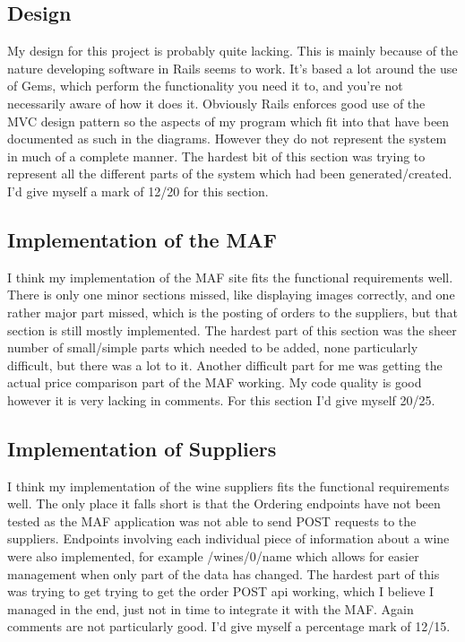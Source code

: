 \documentclass[11pt]{article}
\begin{document}
\subsection{Design}
My design for this project is probably quite lacking. This is mainly because of the nature developing software in Rails seems to work. It's based a lot around the use of Gems, which perform the functionality you need it to, and you're not necessarily aware of how it does it. Obviously Rails enforces good use of the MVC design pattern so the aspects of my program which fit into that have been documented as such in the diagrams. However they do not represent the system in much of a complete manner.
The hardest bit of this section was trying to represent all the different parts of the system which had been generated/created. I'd give myself a mark of 12/20 for this section.

\subsection{Implementation of the MAF}
I think my implementation of the MAF site fits the functional requirements well. There is only one minor sections missed, like displaying images correctly, and one rather major part missed, which is the posting of orders to the suppliers, but that section is still mostly implemented.
The hardest part of this section was the sheer number of small/simple parts which needed to be added, none particularly difficult, but there was a lot to it. Another difficult part for me was getting the actual price comparison part of the MAF working. My code quality is good however it is very lacking in comments.
For this section I'd give myself 20/25.

\subsection{Implementation of Suppliers}
I think my implementation of the wine suppliers fits the functional requirements well. The only place it falls short is that the Ordering endpoints have not been tested as the MAF application was not able to send POST requests to the suppliers. Endpoints involving each individual piece of information about a wine were also implemented, for example /wines/0/name which allows for easier management when only part of the data has changed.
The hardest part of this was trying to get trying to get the order POST api working, which I believe I managed in the end, just not in time to integrate it with the MAF. Again comments are not particularly good.
I'd give myself a percentage mark of 12/15.
\end{document}
